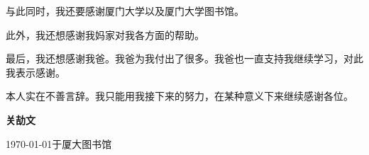 \begin{ack}


与此同时，我还要感谢厦门大学以及厦门大学图书馆。


此外，我还想感谢我妈家对我各方面的帮助。

最后，我还想感谢我爸。我爸为我付出了很多。我爸也一直支持我继续学习，对此我表示感谢。

本人实在不善言辞。我只能用我接下来的努力，在某种意义下来继续感谢各位。
\newline
\newline

\hfill {\fontsize{55}{60}\selectfont\bfseries\kaishu 关劼文}

\hfill{\today 于厦大图书馆}

\end{ack}

